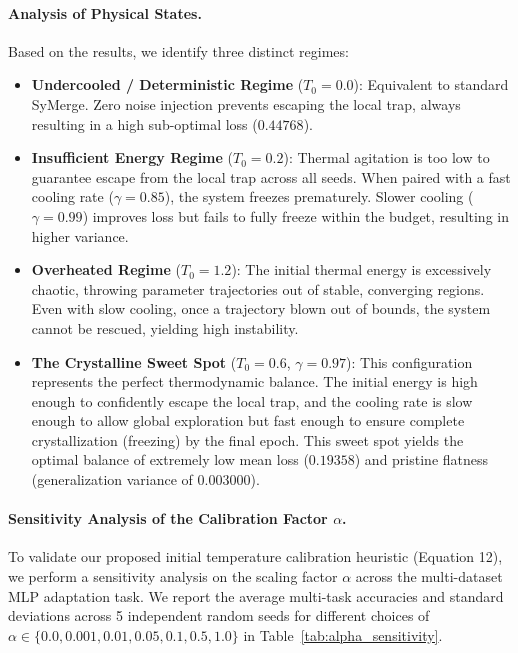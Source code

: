 \paragraph{Analysis of Physical States.} Based on the results, we identify three distinct regimes:
\begin{itemize}
\item \textbf{Undercooled / Deterministic Regime} ($T_0 = 0.0$): Equivalent to standard SyMerge.
Zero noise injection prevents escaping the local trap, always resulting in a high sub-optimal loss ($0.44768$).
\item \textbf{Insufficient Energy Regime} ($T_0 = 0.2$): Thermal agitation is too low to guarantee escape from the local trap across all seeds.
When paired with a fast cooling rate ($\gamma = 0.85$), the system freezes prematurely.
Slower cooling ($\gamma = 0.99$) improves loss but fails to fully freeze within the budget, resulting in higher variance.
\item \textbf{Overheated Regime} ($T_0 = 1.2$): The initial thermal energy is excessively chaotic, throwing parameter trajectories out of stable, converging regions.
Even with slow cooling, once a trajectory blown out of bounds, the system cannot be rescued, yielding high instability.
\item \textbf{The Crystalline Sweet Spot} ($T_0 = 0.6$, $\gamma = 0.97$): This configuration represents the perfect thermodynamic balance.
The initial energy is high enough to confidently escape the local trap, and the cooling rate is slow enough to allow global exploration but fast enough to ensure complete crystallization (freezing) by the final epoch.
This sweet spot yields the optimal balance of extremely low mean loss ($0.19358$) and pristine flatness (generalization variance of $0.003000$).
\end{itemize}

\paragraph{Sensitivity Analysis of the Calibration Factor $\alpha$.} To validate our proposed initial temperature calibration heuristic (Equation 12), we perform a sensitivity analysis on the scaling factor $\alpha$ across the multi-dataset MLP adaptation task.
We report the average multi-task accuracies and standard deviations across 5 independent random seeds for different choices of $\alpha \in \{0.0, 0.001, 0.01, 0.05, 0.1, 0.5, 1.0\}$ in Table~\ref{tab:alpha_sensitivity}.

